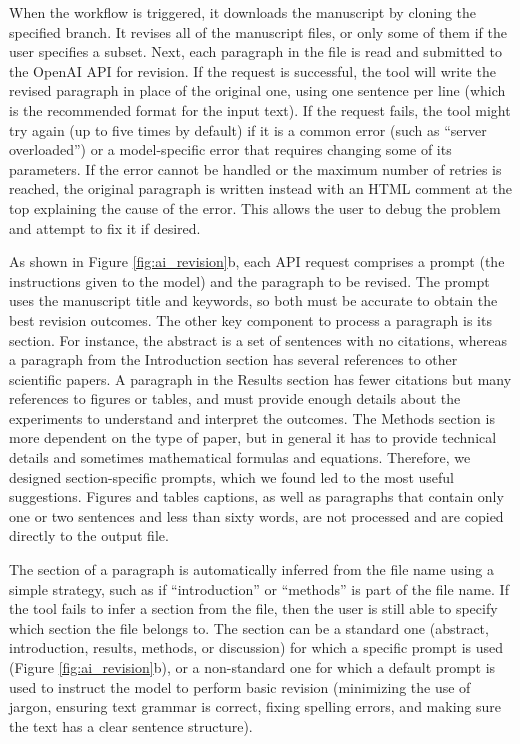 \documentclass[
]{article}
\begin{document}
When the workflow is triggered, it downloads the manuscript by cloning the specified branch.
It revises all of the manuscript files, or only some of them if the user specifies a subset.
Next, each paragraph in the file is read and submitted to the OpenAI API for revision.
If the request is successful, the tool will write the revised paragraph in place of the original one, using one sentence per line (which is the recommended format for the input text).
If the request fails, the tool might try again (up to five times by default) if it is a common error (such as ``server overloaded'') or a model-specific error that requires changing some of its parameters.
If the error cannot be handled or the maximum number of retries is reached, the original paragraph is written instead with an HTML comment at the top explaining the cause of the error.
This allows the user to debug the problem and attempt to fix it if desired.

As shown in Figure \ref{fig:ai_revision}b, each API request comprises a prompt (the instructions given to the model) and the paragraph to be revised.
The prompt uses the manuscript title and keywords, so both must be accurate to obtain the best revision outcomes.
The other key component to process a paragraph is its section.
For instance, the abstract is a set of sentences with no citations, whereas a paragraph from the Introduction section has several references to other scientific papers.
A paragraph in the Results section has fewer citations but many references to figures or tables, and must provide enough details about the experiments to understand and interpret the outcomes.
The Methods section is more dependent on the type of paper, but in general it has to provide technical details and sometimes mathematical formulas and equations.
Therefore, we designed section-specific prompts, which we found led to the most useful suggestions.
Figures and tables captions, as well as paragraphs that contain only one or two sentences and less than sixty words, are not processed and are copied directly to the output file.

The section of a paragraph is automatically inferred from the file name using a simple strategy, such as if ``introduction'' or ``methods'' is part of the file name.
If the tool fails to infer a section from the file, then the user is still able to specify which section the file belongs to.
The section can be a standard one (abstract, introduction, results, methods, or discussion) for which a specific prompt is used (Figure \ref{fig:ai_revision}b), or a non-standard one for which a default prompt is used to instruct the model to perform basic revision (minimizing the use of jargon, ensuring text grammar is correct, fixing spelling errors, and making sure the text has a clear sentence structure).
\end{document}
